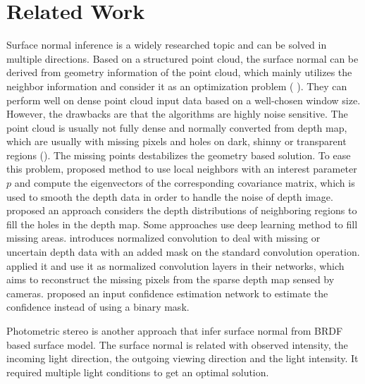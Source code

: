 
\chapter{Related Work} %

\label{ch:02} %




Surface normal inference is a widely researched topic and can be solved in multiple directions. Based on a structured point cloud, the surface normal can be derived from geometry information of the point cloud, which mainly utilizes the neighbor information and consider it as an optimization problem (\cite{optimized-methods} ). They can perform well on dense point cloud input data based on a well-chosen window size. However, the drawbacks are that the algorithms are highly noise sensitive. 
The point cloud is usually not fully dense and normally converted from depth map, which are usually with missing pixels and holes on dark, shinny or transparent regions (\cite{nyu}). The missing points destabilizes the geometry based solution. To ease this problem, \cite{Holzer.S} proposed method to use local neighbors with an interest parameter $ p $ and compute the eigenvectors of the corresponding covariance matrix, which is used to smooth the depth data in order to handle the noise of depth image.  \cite{depth-inpainting-distribution} proposed an approach considers the depth distributions of neighboring regions to fill the holes in the depth map. 
Some approaches use deep learning method to fill missing areas. \cite{nconv} introduces normalized convolution to deal with missing or uncertain depth data with an added mask on the standard convolution operation. \cite{ncnn} applied it and use it as normalized convolution layers in their networks, which aims to reconstruct the missing pixels from the sparse depth map sensed by cameras. \cite{pncnn} proposed an input confidence estimation network to estimate the confidence instead of using a binary mask.


Photometric stereo is another approach that infer surface normal from BRDF based surface model. The surface normal is related with observed intensity, the incoming light direction, the outgoing viewing direction and the light intensity. It required multiple light conditions to get an optimal solution. 







